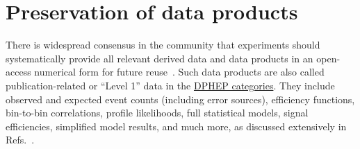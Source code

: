 \documentclass[11pt]{article}
\begin{document}
\begin{description}
\end{description}



\section{Preservation of data products}
\label{data-products}

There is widespread consensus in the community that experiments should systematically provide all relevant derived data and data products in an open-access numerical form for future reuse~\cite{LHCReinterpretationForum:2020xtr}. 
Such data products are also called publication-related or ``Level 1'' data in the 
\href{https://opendata.cern.ch/docs/about}{DPHEP categories}. 
They include observed and expected event counts  (including error sources), efficiency functions,  bin-to-bin correlations, profile likelihoods, full statistical models, signal efficiencies, simplified model results, and much more, 
as discussed extensively in Refs.~\cite{LHCReinterpretationForum:2020xtr,Cranmer:2021urp}.
\end{document}
